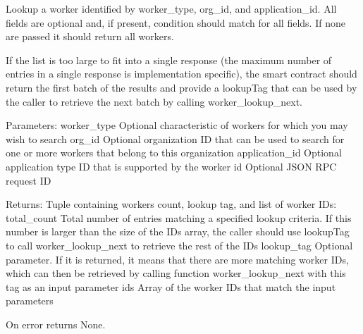\begin{DoxyVerb}Lookup a worker identified by worker_type, org_id, and application_id.
All fields are optional and, if present, condition should match for
all fields. If none are passed it should return all workers.

If the list is too large to fit into a single response (the maximum
number of entries in a single response is implementation specific),
the smart contract should return the first batch of the results
and provide a lookupTag that can be used by the caller to
retrieve the next batch by calling worker_lookup_next.

Parameters:
worker_type    Optional characteristic of workers for which you may
       wish to search
org_id         Optional organization ID that can be used to search
       for one or more workers that belong to this
       organization
application_id Optional application type ID that is supported by
       the worker
id             Optional JSON RPC request ID

Returns:
Tuple containing workers count, lookup tag, and list of
worker IDs:
total_count Total number of entries matching a specified
    lookup criteria. If this number is larger than the
    size of the IDs array, the caller should use
    lookupTag to call worker_lookup_next to retrieve
    the rest of the IDs
lookup_tag  Optional parameter. If it is returned, it means
    that there are more matching worker IDs, which can then
    be retrieved by calling function worker_lookup_next
    with this tag as an input parameter
ids         Array of the worker IDs that match the input parameters

On error returns None.
\end{DoxyVerb}
 \mbox{\label{classavalon__sdk_1_1connector_1_1blockchains_1_1ethereum_1_1ethereum__worker__registry_1_1EthereumWorkerRegistryImpl_a6491ee03885089b8d6fcad548d233c8a}} 

